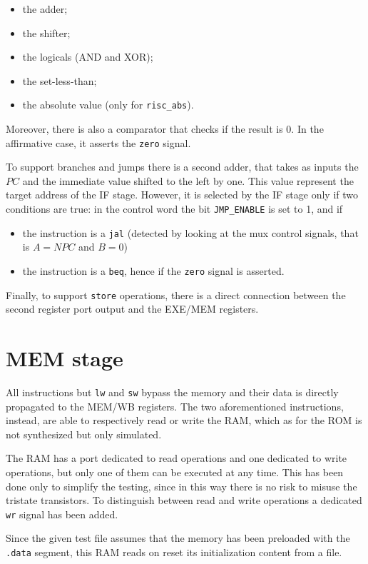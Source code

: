 \begin{itemize}
    \item the adder;
    \item the shifter;
    \item the logicals (AND and XOR);
    \item the set-less-than;
    \item the absolute value (only for \verb|risc_abs|).
\end{itemize}

Moreover, there is also a comparator that checks if the result is 0. In the affirmative case, it asserts the \verb|zero| signal.

To support branches and jumps there is a second adder, that takes as inputs the $PC$ and the immediate value shifted to the left
by one. This value represent the target address of the IF stage. However, it is selected by the IF stage only if two conditions
are true: in the control word the bit \verb|JMP_ENABLE| is set to 1, and if

\begin{itemize}
    \item the instruction is a \verb|jal| (detected by looking at the mux control signals, that is $A = NPC$ and $B = 0$)
    \item the instruction is a \verb|beq|, hence if the \verb|zero| signal is asserted.
\end{itemize}

Finally, to support \verb|store| operations, there is a direct connection between the second register port output and the EXE/MEM registers.

\section{MEM stage}
All instructions but \verb|lw| and \verb|sw| bypass the memory and their data is directly propagated to the MEM/WB registers.
The two aforementioned instructions, instead, are able to respectively read or write the RAM, which as for the ROM is not
synthesized but only simulated.

The RAM has a port dedicated to read operations and one dedicated to write operations, but only one of them can be executed
at any time. This has been done only to simplify the testing, since in this way there is no risk to misuse the tristate transistors.
To distinguish between read and write operations a dedicated \verb|wr| signal has been added.

Since the given test file assumes that the memory has been preloaded with the \verb|.data| segment, this RAM reads on reset
its initialization content from a file.


